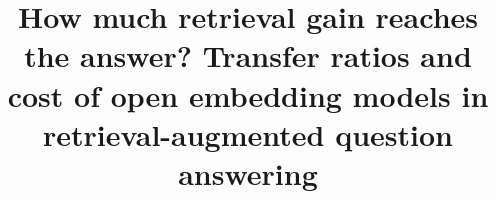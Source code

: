 \documentclass[a4paper,fleqn]{cas-sc}
\begin{document}
\let\WriteBookmarks\relax
\def\floatpagepagefraction{1}
\def\textpagefraction{.001}


\title[mode=title]{How much retrieval gain reaches the answer? Transfer ratios and cost of open embedding models in retrieval-augmented question answering}



\maketitle















\appendix

\end{document}
